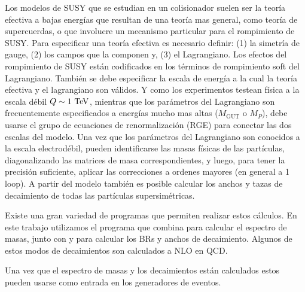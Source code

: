 Los modelos de SUSY que se estudian en un colisionador suelen ser la teoría
efectiva a bajas energías que resultan de una teoría mas general, como teoría de
supercuerdas, o que involucre un mecanismo particular para el rompimiento de
SUSY. Para especificar una teoría efectiva es necesario definir: (1) la simetría
de gauge, (2) los campos que la componen y, (3) el Lagrangiano. Los efectos del
rompimiento de SUSY están codificados en los términos de rompimiento soft del
Lagrangiano. También se debe especificar la escala de energía a la cual la
teoría efectiva y el lagrangiano son válidos. Y como los experimentos testean
física a la escala débil $Q\sim 1 \tev$, mientras que los parámetros del
Lagrangiano son frecuentemente especificados a energías mucho mas altas
($M_\text{GUT}$ o $M_P$), debe usarse el grupo de ecuaciones de renormalización
(RGE) para conectar las dos escalas del modelo.
Una vez que los parámetros del Lagrangiano son conocidos a la escala
electrodébil, pueden identificarse las masas físicas de las partículas,
diagonalizando las matrices de masa correspondientes, y luego, para tener la
precisión suficiente, aplicar las correcciones a ordenes mayores (en general a 1
loop). A partir del modelo también es posible calcular los anchos y tazas de
decaimiento de todas las partículas supersimétricas.

Existe una gran variedad de programas que permiten realizar estos cálculos.
En este trabajo utilizamos el programa
{\susyhit}\cite{Djouadi:2006bz} que combina {\suspect}\cite{Djouadi2007426}
para calcular el espectro de masas, junto
con {\sdecay}\cite{Muhlleitner:2004mka} y {\hdecay}\cite{Djouadi:1997yw}
para calcular los BRs y anchos de decaimiento. Algunos de estos modos de
decaimientos son calculados a NLO en QCD.


Una vez que el espectro de masas y los decaimientos están calculados estos
pueden usarse como entrada en los generadores de eventos.


